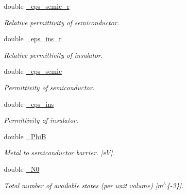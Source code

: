 \begin{DoxyCompactItemize}
double \mbox{\hyperlink{class_probl_a88564b00d94b1dffd93e5d109707e0e8}{\+\_\+eps\+\_\+semic\+\_\+r}}
\begin{DoxyCompactList}\small\item\em Relative permittivity of semiconductor. \end{DoxyCompactList}\item 
\mbox{\label{class_probl_a220382bc676780448992b57a9bae1a5c}} 
double \mbox{\hyperlink{class_probl_a220382bc676780448992b57a9bae1a5c}{\+\_\+eps\+\_\+ins\+\_\+r}}
\begin{DoxyCompactList}\small\item\em Relative permittivity of insulator. \end{DoxyCompactList}\item 
\mbox{\label{class_probl_a150be16b329bcc39d0f1dfe6fa2d090d}} 
double \mbox{\hyperlink{class_probl_a150be16b329bcc39d0f1dfe6fa2d090d}{\+\_\+eps\+\_\+semic}}
\begin{DoxyCompactList}\small\item\em Permittivity of semiconductor. \end{DoxyCompactList}\item 
\mbox{\label{class_probl_a512685085ee09e514df373b4b778f7a8}} 
double \mbox{\hyperlink{class_probl_a512685085ee09e514df373b4b778f7a8}{\+\_\+eps\+\_\+ins}}
\begin{DoxyCompactList}\small\item\em Permittivity of insulator. \end{DoxyCompactList}\item 
\mbox{\label{class_probl_a37f80bf6f219fb96b047457e4eb25bdf}} 
double \mbox{\hyperlink{class_probl_a37f80bf6f219fb96b047457e4eb25bdf}{\+\_\+\+PhiB}}
\begin{DoxyCompactList}\small\item\em Metal to semiconductor barrier. \mbox{[}eV\mbox{]}. \end{DoxyCompactList}\item 
\mbox{\label{class_probl_a5be218969c9f1491b82367cf6e59d5c6}} 
double \mbox{\hyperlink{class_probl_a5be218969c9f1491b82367cf6e59d5c6}{\+\_\+\+N0}}
\begin{DoxyCompactList}\small\item\em Total number of available states (per unit volume) \mbox{[}m$^\wedge$\{-\/3\}\mbox{]}. \end{DoxyCompactList}\item 

\end{DoxyCompactItemize}
